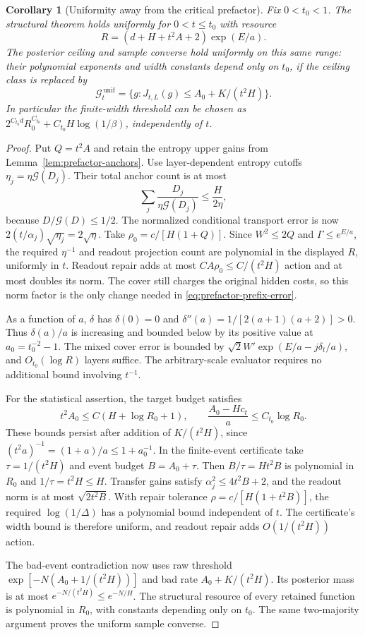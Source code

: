 \documentclass[11pt]{article}
\newtheorem{corollary}[theorem]{Corollary}
\theoremstyle{remark}
\newcommand{\Gain}{\mathcal G}
\begin{document}
\begin{corollary}[Uniformity away from the critical prefactor]
\label{cor:prefactor-uniform}
Fix $0<t_0<1$. The structural theorem holds uniformly for
$0<t\le t_0$ with resource
\[
 R=(d+H+t^2A+2)\exp(E/a).
\]
The posterior ceiling and sample converse hold uniformly on this
same range: their polynomial exponents and width constants depend
only on $t_0$, if the ceiling class is replaced by
\[
 \mathcal G_t^{\,\mathrm{unif}}
 =\{g:J_{t,L}(g)\le A_0+K/(t^2H)\}.
\]
In particular the finite-width threshold can be chosen as
$2^{C_{t_0}d}R_0^{C_{t_0}}+C_{t_0}H\log(1/\beta)$,
independently of $t$.
\end{corollary}
\begin{proof}
Put $Q=t^2A$ and retain the entropy upper gains from
Lemma~\ref{lem:prefactor-anchors}. Use layer-dependent entropy
cutoffs $\eta_j=\eta\Gain(D_j)$. Their total anchor count is
at most
\[
 \sum_j\frac{D_j}{\eta\Gain(D_j)}
 \le\frac{H}{2\eta},
\]
because $D/\Gain(D)\le1/2$. The normalized conditional
transport error is now
$2(t/\alpha_j)\sqrt{\eta_j}=2\sqrt\eta$.
Take $\rho_0=c/[H(1+Q)]$. Since $W^2\le2Q$ and
$\Gamma\le e^{E/a}$, the required $\eta^{-1}$ and readout
projection count are polynomial in the displayed $R$,
uniformly in $t$. Readout repair adds at most
$CA\rho_0\le C/(t^2H)$ action and at most doubles its norm.
The cover still charges the original hidden costs, so this
norm factor is the only change needed in
\eqref{eq:prefactor-prefix-error}.

As a function of $a$, $\delta$ has $\delta(0)=0$ and
$\delta''(a)=1/[2(a+1)(a+2)]>0$. Thus $\delta(a)/a$ is
increasing and bounded below by its positive value at
$a_0=t_0^{-2}-1$. The mixed cover error is bounded by
$\sqrt2W'\exp(E/a-j\delta_t/a)$, and $O_{t_0}(\log R)$
layers suffice. The arbitrary-scale evaluator requires no
additional bound involving $t^{-1}$.

For the statistical assertion, the target budget satisfies
\[
 t^2A_0\le C(H+\log R_0+1),\qquad
 \frac{A_0-Hc_t}{a}\le C_{t_0}\log R_0.
\]
These bounds persist after addition of $K/(t^2H)$, since
$(t^2a)^{-1}=(1+a)/a\le1+a_0^{-1}$.
In the finite-event certificate take
$\tau=1/(t^2H)$ and event budget $B=A_0+\tau$.
Then $B/\tau=Ht^2B$ is polynomial in $R_0$ and
$1/\tau=t^2H\le H$. Transfer gains satisfy
$\alpha_j^2\le4t^2B+2$, and the readout norm is at most
$\sqrt{2t^2B}$. With repair tolerance
$\rho=c/[H(1+t^2B)]$, the required
$\log(1/\Delta)$ has a polynomial bound independent of $t$.
The certificate's width bound is therefore uniform, and
readout repair adds $O(1/(t^2H))$ action.

The bad-event contradiction now uses raw threshold
$\exp[-N(A_0+1/(t^2H))]$ and bad rate
$A_0+K/(t^2H)$. Its posterior mass is at most
$e^{-N/(t^2H)}\le e^{-N/H}$. The structural resource of
every retained function is polynomial in $R_0$, with constants
depending only on $t_0$. The same two-majority argument proves
the uniform sample converse.
\end{proof}
\end{document}
